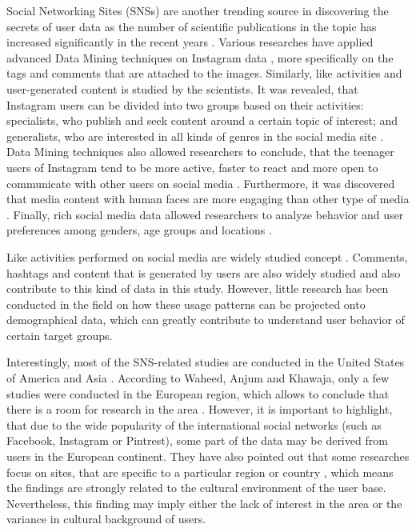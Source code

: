 Social Networking Sites (SNSs) are another trending source in discovering the secrets of user data as the number of scientific publications in the topic has increased significantly in the recent years \cite{waheed2017investigation}. Various researches have applied advanced Data Mining techniques on Instagram data \cite{jang2015noreciprocity, bakhshi2014faces, hu2014we, jang2016teensengagemorewithfewerphotos, han2016teensarefrommars}, more specifically on the tags and comments that are attached to the images. Similarly, like activities and user-generated content is studied by the scientists. It was revealed, that Instagram users can be divided into two groups based on their activities: specialists, who publish and seek content around a certain topic of interest; and generalists, who are interested in all kinds of genres in the social media site \cite{jang2015noreciprocity}. Data Mining techniques also allowed researchers to conclude, that the teenager users of Instagram tend to be more active, faster to react and more open to communicate with other users on social media \cite{jang2016teensengagemorewithfewerphotos, han2016teensarefrommars}. Furthermore, it was discovered that media content with human faces are more engaging than other type of media \cite{bakhshi2014faces}. Finally, rich social media data allowed researchers to analyze behavior and user preferences among genders, age groups and locations \cite{farseev2015harvestingmultiplesources}.

Like activities performed on social media are widely studied concept \cite{bakhshi2014faces, jang2015noreciprocity, jang2016teensengagemorewithfewerphotos, ottoni2013ladies}. Comments, hashtags and content that is generated by users are also widely studied \cite{bakhshi2014faces, jang2016teensengagemorewithfewerphotos, hu2014we, bakhshi2014faces} and also contribute to this kind of data in this study. However, little research has been conducted in the field on how these usage patterns can be projected onto demographical data, which can greatly contribute to understand user behavior of certain target groups. 

Interestingly, most of the SNS-related studies are conducted in the United States of America and Asia \cite{waheed2017investigation}. According to Waheed, Anjum and Khawaja, only a few studies were conducted in the European region, which allows to conclude that there is a room for research in the area \cite{waheed2017investigation}. However, it is important to highlight, that due to the wide popularity of the international social networks (such as Facebook, Instagram or Pintrest), some part of the data may be derived from users in the European continent. They have also pointed out that some researches focus on sites, that are specific to a particular region or country \cite{waheed2017investigation}, which means the findings are strongly related to the cultural environment of the user base. Nevertheless, this finding may imply either the lack of interest in the area or the variance in cultural background of users. 


